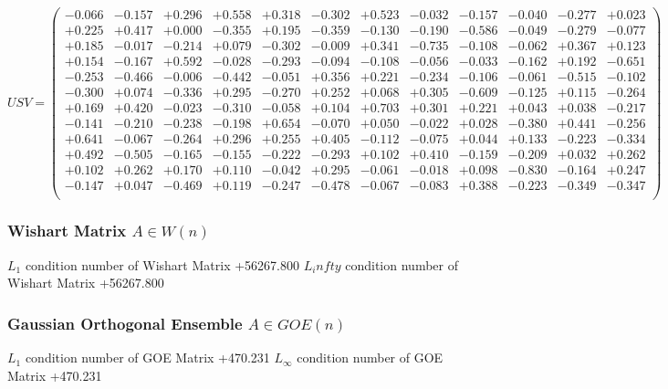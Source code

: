 \documentclass[9pt]{article}
\theoremstyle{plain}
\theoremstyle{definition}
\theoremstyle{remark}
\numberwithin{equation}{section}
\begin{document}
$U S V = \left(
\begin{array}{
cccccccccccc}
-0.066 & -0.157 & +0.296 & +0.558 & +0.318 & -0.302 & +0.523 & -0.032 & -0.157 & -0.040 & -0.277 & +0.023 \\
+0.225 & +0.417 & +0.000 & -0.355 & +0.195 & -0.359 & -0.130 & -0.190 & -0.586 & -0.049 & -0.279 & -0.077 \\
+0.185 & -0.017 & -0.214 & +0.079 & -0.302 & -0.009 & +0.341 & -0.735 & -0.108 & -0.062 & +0.367 & +0.123 \\
+0.154 & -0.167 & +0.592 & -0.028 & -0.293 & -0.094 & -0.108 & -0.056 & -0.033 & -0.162 & +0.192 & -0.651 \\
-0.253 & -0.466 & -0.006 & -0.442 & -0.051 & +0.356 & +0.221 & -0.234 & -0.106 & -0.061 & -0.515 & -0.102 \\
-0.300 & +0.074 & -0.336 & +0.295 & -0.270 & +0.252 & +0.068 & +0.305 & -0.609 & -0.125 & +0.115 & -0.264 \\
+0.169 & +0.420 & -0.023 & -0.310 & -0.058 & +0.104 & +0.703 & +0.301 & +0.221 & +0.043 & +0.038 & -0.217 \\
-0.141 & -0.210 & -0.238 & -0.198 & +0.654 & -0.070 & +0.050 & -0.022 & +0.028 & -0.380 & +0.441 & -0.256 \\
+0.641 & -0.067 & -0.264 & +0.296 & +0.255 & +0.405 & -0.112 & -0.075 & +0.044 & +0.133 & -0.223 & -0.334 \\
+0.492 & -0.505 & -0.165 & -0.155 & -0.222 & -0.293 & +0.102 & +0.410 & -0.159 & -0.209 & +0.032 & +0.262 \\
+0.102 & +0.262 & +0.170 & +0.110 & -0.042 & +0.295 & -0.061 & -0.018 & +0.098 & -0.830 & -0.164 & +0.247 \\
-0.147 & +0.047 & -0.469 & +0.119 & -0.247 & -0.478 & -0.067 & -0.083 & +0.388 & -0.223 & -0.349 & -0.347 \\
\end{array}
\right)$ \newline 

\subsubsection{Wishart Matrix $A \in W(n)$}
$L_1$ condition number of Wishart Matrix +56267.800
$L_infty$ condition number of Wishart Matrix +56267.800
\subsubsection{Gaussian Orthogonal Ensemble $A \in GOE(n)$}
$L_1$ condition number of GOE Matrix +470.231
$L_\infty$ condition number of GOE Matrix +470.231
\end{document}
